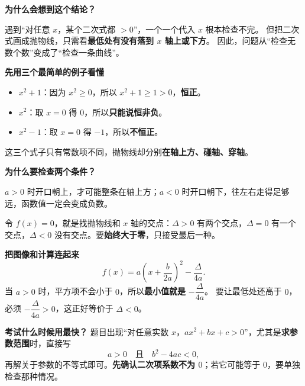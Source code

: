 \begin{explanationbox}
  \textbf{\textcolor{CExplanation}{为什么会想到这个结论？}}

  遇到“对任意 $x$，某个二次式都 $>0$”，一个一个代入 $x$ 根本检查不完。
  但把二次式画成抛物线，只需看\textbf{最低处有没有落到 $x$ 轴上或下方}。
  因此，问题从“检查无数个数”变成了“检查一条曲线”。

  \medskip
  \textbf{\textcolor{CExplanation}{先用三个最简单的例子看懂}}

  \begin{itemize}[leftmargin=*,itemsep=0.3em]
    \item $x^2+1$：因为 $x^2\ge0$，所以 $x^2+1\ge1>0$，\textbf{恒正}。
    \item $x^2$：取 $x=0$ 得 $0$，所以\textbf{只能说恒非负}。
    \item $x^2-1$：取 $x=0$ 得 $-1$，所以\textbf{不恒正}。
  \end{itemize}
  这三个式子只有常数项不同，抛物线却分别\textbf{在轴上方、碰轴、穿轴}。

  \begin{center}
  
  \end{center}

  \textbf{\textcolor{CExplanation}{为什么要检查两个条件？}}
  \begin{description}[style=nextline,leftmargin=2.8em,labelsep=0.5em,itemsep=0.45em]
    \item[\textbf{第一关：开口朝哪边？}]
      $a>0$ 时开口朝上，才可能整条在轴上方；$a<0$ 时开口朝下，往左右走得足够远，函数值一定会变成负数。
    \item[\textbf{第二关：有没有碰到横轴？}]
      令 $f(x)=0$，就是找抛物线和 $x$ 轴的交点：$\Delta>0$ 有两个交点，$\Delta=0$ 有一个交点，$\Delta<0$ 没有交点。要\textbf{始终大于零}，只接受最后一种。
  \end{description}

  \textbf{\textcolor{CExplanation}{把图像和计算连起来}}
  \[
    f(x)=a\left(x+\frac{b}{2a}\right)^2-\frac{\Delta}{4a}.
  \]
  当 $a>0$ 时，平方项不会小于 $0$，所以\textbf{最小值就是} $-\dfrac{\Delta}{4a}$。
  要让最低处还高于 $0$，必须 $-\dfrac{\Delta}{4a}>0$，这正好等价于 $\Delta<0$。

  \medskip
  \textbf{\textcolor{CExplanation}{考试什么时候用最快？}}
  题目出现“对任意实数 $x$，$ax^2+bx+c>0$”，尤其是\textbf{求参数范围}时，直接写
  \[
    \boxed{a>0\quad\text{且}\quad b^2-4ac<0},
  \]
  再解关于参数的不等式即可。\textbf{先确认二次项系数不为 $0$}；若它可能等于 $0$，要单独检查那种情况。
\end{explanationbox}
